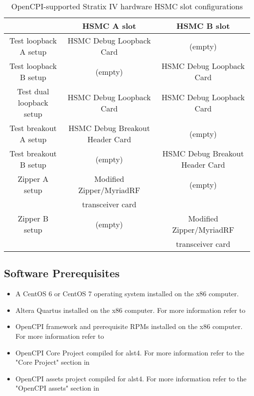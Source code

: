 \documentclass{article}
\begin{document}
\begin{center}
        \begin{table}[!htbp]
        \centering
        \caption{OpenCPI-supported Stratix IV hardware HSMC slot configurations}
        \label{table:supported_slots}
        \begin{tabular}{c|c|c|}
                \cline{2-3}
                & HSMC A slot & HSMC B slot \\ \hline
                \multicolumn{1}{|c|}{Test loopback A setup} & HSMC Debug Loopback Card & (empty)\\ \hline
                \multicolumn{1}{|c|}{Test loopback B setup} & (empty) & HSMC Debug Loopback Card \\ \hline
                \multicolumn{1}{|c|}{Test dual loopback setup} & HSMC Debug Loopback Card & HSMC Debug Loopback Card \\ \hline
                \multicolumn{1}{|c|}{Test breakout A setup} & HSMC Debug Breakout Header Card & (empty)\\ \hline
                \multicolumn{1}{|c|}{Test breakout B setup} & (empty) & HSMC Debug Breakout Header Card \\ \hline
                \multicolumn{1}{|c|}{Zipper A setup} & Modified\cite{zipper_mods} Zipper/MyriadRF & (empty)\\
                \multicolumn{1}{|c|}{ } & transceiver card & \\ \hline
                \multicolumn{1}{|c|}{Zipper B setup} & (empty) & Modified\cite{zipper_mods} Zipper/MyriadRF \\
                \multicolumn{1}{|c|}{ } & & transceiver card \\ \hline
        \end{tabular}
        \end{table}
\end{center}

\subsection*{Software Prerequisites}
\begin{itemize}
\item A CentOS 6 or CentOS 7 operating system installed on the x86 computer.
\item Altera Quartus installed on the x86 computer. For more information refer to \cite{fpga_vendor_tool_guide}
\item OpenCPI framework and prerequisite RPMs installed on the x86 computer. For more information refer to \cite{rpm_installation_guide}
\item OpenCPI Core Project compiled for alst4. For more information refer to the "Core Project" section in \cite{Opencpi_getting_started_guide}
\item OpenCPI assets project compiled for alst4. For more information refer to the "OpenCPI assets" section in \cite{Opencpi_getting_started_guide}
\end{itemize}
\end{document}

